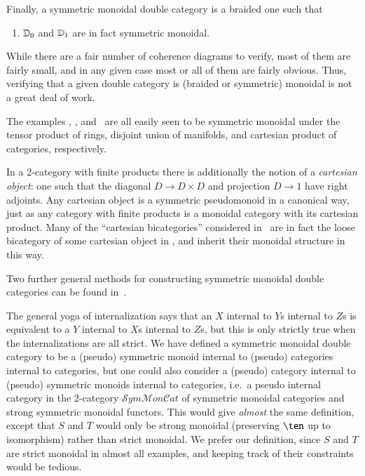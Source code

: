 Finally, a symmetric monoidal double category is a braided one such that
\begin{enumerate}\setcounter{enumi}{\value{mondbl}}
\item $\mathbb{D}_0$ and $\mathbb{D}_1$ are in fact symmetric monoidal.
\end{enumerate}
While there are a fair number of coherence diagrams to verify, most of
them are fairly small, and in any given case most or all of them are
fairly obvious.  Thus, verifying that a given double category is
(braided or symmetric) monoidal is not a great deal of work.

\begin{eg}
  The examples \lMod, \lnCob, and \lProf\ are all easily seen to be
  symmetric monoidal under the tensor product of rings, disjoint union
  of manifolds, and cartesian product of categories, respectively.
\end{eg}

\begin{rmk}
  In a 2-category with finite products there is additionally the
  notion of a \emph{cartesian object}: one such that the diagonal
  $D\to D\times D$ and projection $D\to 1$ have right adjoints.  Any
  cartesian object is a symmetric pseudomonoid in a canonical way,
  just as any category with finite products is a monoidal category
  with its cartesian product.  Many of the ``cartesian bicategories''
  considered in~\cite{cw:cart-bicats-i,ckww:cartbicats-ii} are in
  fact the loose bicategory of some cartesian object in \cDbl,
  and inherit their monoidal structure in this way.
\end{rmk}

Two further general methods for constructing symmetric monoidal double
categories can be found in~\cite{shulman:frbi}.

\begin{rmk}
  The general yoga of internalization says that an $X$ internal to
  $Y$s internal to $Z$s is equivalent to a $Y$ internal to $X$s
  internal to $Z$s, but this is only strictly true when the
  internalizations are all strict.  We have defined a symmetric
  monoidal double category to be a (pseudo) symmetric monoid internal
  to (pseudo) categories internal to categories, but one could also
  consider a (pseudo) category internal to (pseudo) symmetric monoids
  internal to categories, i.e.\ a pseudo internal category in the
  2-category
  $\mathcal{S}\mathit{ym}\mathcal{M}\mathit{on}\mathcal{C}\mathit{at}$
  of symmetric monoidal categories and strong symmetric monoidal
  functors.  This would give \emph{almost} the same definition, except
  that $S$ and $T$ would only be strong monoidal (preserving $\ten$ up
  to isomorphism) rather than strict monoidal.  We prefer our
  definition, since $S$ and $T$ are strict monoidal in almost all
  examples, and keeping track of their constraints would be tedious.
\end{rmk}


